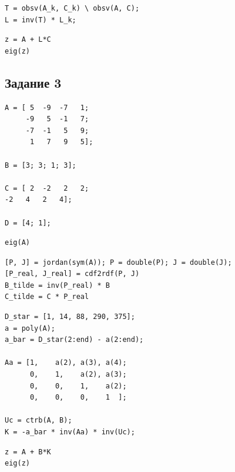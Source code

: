 \documentclass[a4paper,12pt]{article}
\begin{document}
\begin{lstlisting}[caption={Переход в исходный базис}, label={lst:lobs}]
T = obsv(A_k, C_k) \ obsv(A, C);
L = inv(T) * L_k;
\end{lstlisting}

\begin{lstlisting}[caption={Проверка собственных чисел матрицы замкнутой системы}, label={lst:check}]
z = A + L*C
eig(z)

\end{lstlisting}



\newpage
\subsection*{Задание 3}

\begin{lstlisting}[caption={Инициализация}]
A = [ 5  -9  -7   1;
	 -9   5  -1   7;
	 -7  -1   5   9;
	  1   7   9   5];

B = [3; 3; 1; 3];

C = [ 2  -2   2   2;
-2   4   2   4];

D = [4; 1];
\end{lstlisting}

\begin{lstlisting}[caption={Собственные числа матрицы системы}, label={lst:eig3}]
eig(A)
\end{lstlisting}

\begin{lstlisting}[caption={Поиск вещественной Жордановой формы}, label={lst:jordan3}]
[P, J] = jordan(sym(A)); P = double(P); J = double(J);
[P_real, J_real] = cdf2rdf(P, J)
B_tilde = inv(P_real) * B
C_tilde = C * P_real
\end{lstlisting}

\begin{lstlisting}[caption={Синтез матрицы $K$ методом Басса-Гура}, label={lst:K3}]
D_star = [1, 14, 88, 290, 375];
a = poly(A);
a_bar = D_star(2:end) - a(2:end);

Aa = [1,    a(2), a(3), a(4);
	  0,    1,    a(2), a(3);
      0,    0,    1,    a(2);
	  0,    0,    0,    1  ];

Uc = ctrb(A, B);
K = -a_bar * inv(Aa) * inv(Uc);
\end{lstlisting}

\begin{lstlisting}[caption={Проверка спектра замкнутой системы}, label={lst:eig3check}]
z = A + B*K
eig(z)
\end{lstlisting}
\end{document}
